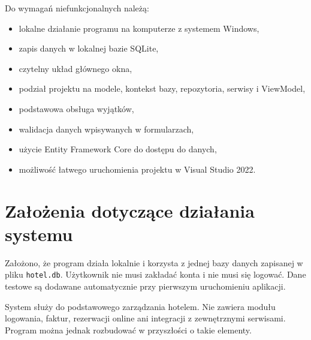 Do wymagań niefunkcjonalnych należą:

\begin{itemize}
  \item lokalne działanie programu na komputerze z systemem Windows,
  \item zapis danych w lokalnej bazie SQLite,
  \item czytelny układ głównego okna,
  \item podział projektu na modele, kontekst bazy, repozytoria, serwisy i ViewModel,
  \item podstawowa obsługa wyjątków,
  \item walidacja danych wpisywanych w formularzach,
  \item użycie Entity Framework Core do dostępu do danych,
  \item możliwość łatwego uruchomienia projektu w Visual Studio 2022.
\end{itemize}

\section{Założenia dotyczące działania systemu}

Założono, że program działa lokalnie i korzysta z jednej bazy danych zapisanej w pliku \texttt{hotel.db}. Użytkownik nie musi zakładać konta i nie musi się logować. Dane testowe są dodawane automatycznie przy pierwszym uruchomieniu aplikacji.

System służy do podstawowego zarządzania hotelem. Nie zawiera modułu logowania, faktur, rezerwacji online ani integracji z zewnętrznymi serwisami. Program można jednak rozbudować w przyszłości o takie elementy.

